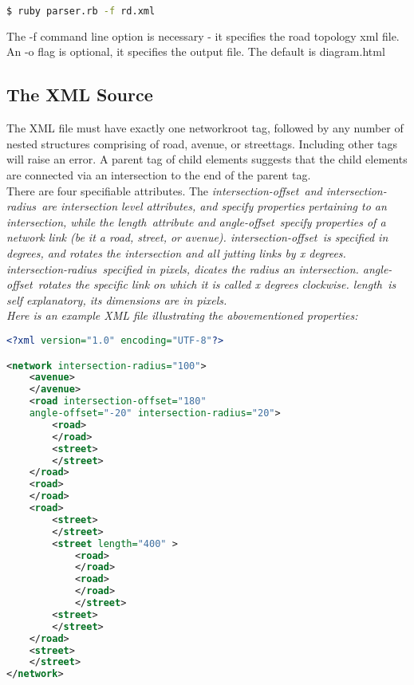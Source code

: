 \documentclass{article}
\begin{document}
\begin{lstlisting}[language=bash]
  $ ruby parser.rb -f rd.xml
\end{lstlisting}

The -f command line option is necessary - it specifies the road topology xml file. An -o flag is optional, it specifies the output file. The default is diagram.html

\subsection{The XML Source}

The XML file must have exactly one \textlangle network\textrangle  root tag, followed by any number of nested structures comprising of \textlangle road\textrangle, \textlangle avenue\textrangle, or \textlangle street\textrangle tags. Including other tags will raise an error. A parent tag of child elements suggests that the child elements are connected via an intersection to the end of the parent tag.\\

There are four specifiable attributes. The \em{intersection-offset}\em\ and \em{intersection-radius}\em\ are intersection level attributes, and specify properties pertaining to an intersection, while the \em{length}\em\ attribute and \em{angle-offset}\em\ specify properties of a network link (be it a road, street, or avenue). \em{intersection-offset}\em\ is specified in degrees, and rotates the intersection and all jutting links by x degrees. \em{intersection-radius}\em\, specified in pixels, dicates the radius an intersection. \em{angle-offset}\em\ rotates the specific link on which it is called x degrees clockwise. \em{length}\em\ is self explanatory, its dimensions are in pixels.\\

Here is an example XML file illustrating the abovementioned properties:

\begin{lstlisting}[language=xml]
<?xml version="1.0" encoding="UTF-8"?>

<network intersection-radius="100">
	<avenue>
	</avenue>
	<road intersection-offset="180" 
	angle-offset="-20" intersection-radius="20">
		<road>
		</road>
		<street>
		</street>
	</road>
	<road>
	</road>
	<road>
		<street>
		</street>
		<street length="400" >
			<road>
			</road>
			<road>
			</road>
			</street>
		<street>
		</street>
	</road>
	<street>
	</street>
</network>
\end{lstlisting}
\end{document}
